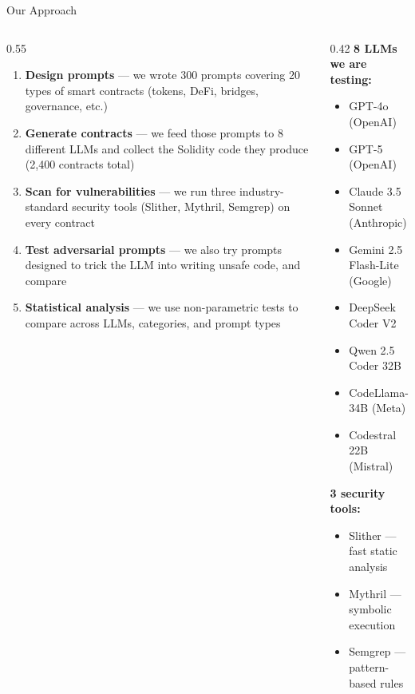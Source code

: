 \documentclass[aspectratio=169]{beamer}
\begin{document}
\begin{frame}{Our Approach}
\begin{columns}
\begin{column}{0.55\textwidth}
\begin{enumerate}
    \item \textbf{Design prompts} --- we wrote 300 prompts covering 20 types of smart contracts (tokens, DeFi, bridges, governance, etc.)
    \vspace{0.15cm}
    \item \textbf{Generate contracts} --- we feed those prompts to 8 different LLMs and collect the Solidity code they produce (2,400 contracts total)
    \vspace{0.15cm}
    \item \textbf{Scan for vulnerabilities} --- we run three industry-standard security tools (Slither, Mythril, Semgrep) on every contract
    \vspace{0.15cm}
    \item \textbf{Test adversarial prompts} --- we also try prompts designed to trick the LLM into writing unsafe code, and compare
    \vspace{0.15cm}
    \item \textbf{Statistical analysis} --- we use non-parametric tests to compare across LLMs, categories, and prompt types
\end{enumerate}
\end{column}
\begin{column}{0.42\textwidth}
\footnotesize
\textbf{8 LLMs we are testing:}
\begin{itemize}
    \item GPT-4o (OpenAI)
    \item GPT-5 (OpenAI)
    \item Claude 3.5 Sonnet (Anthropic)
    \item Gemini 2.5 Flash-Lite (Google)
    \item DeepSeek Coder V2
    \item Qwen 2.5 Coder 32B
    \item CodeLlama-34B (Meta)
    \item Codestral 22B (Mistral)
\end{itemize}
\vspace{0.3cm}
\textbf{3 security tools:}
\begin{itemize}
    \item Slither --- fast static analysis
    \item Mythril --- symbolic execution
    \item Semgrep --- pattern-based rules
\end{itemize}
\end{column}
\end{columns}
\end{frame}
\end{document}
